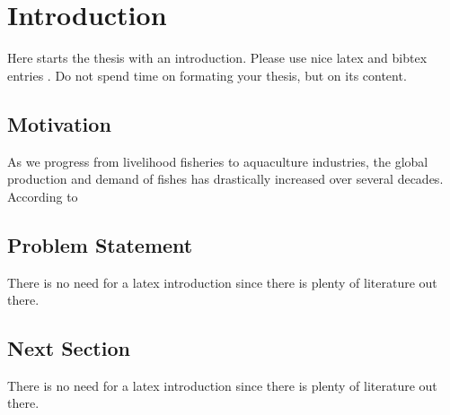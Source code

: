 \chapter{Introduction}
\label{chapter:Introduction}



Here starts the thesis with an introduction. Please use nice latex and bibtex entries \cite{latex}. Do not spend time on formating your thesis, but on its content. 
 
\section{Motivation}
As we progress from livelihood fisheries to aquaculture industries, the global production and demand of fishes has drastically increased over several decades. According to 

\section{Problem Statement}
There is no need for a latex introduction since there is plenty of literature out there.


\section{Next Section}
There is no need for a latex introduction since there is plenty of literature out there.
